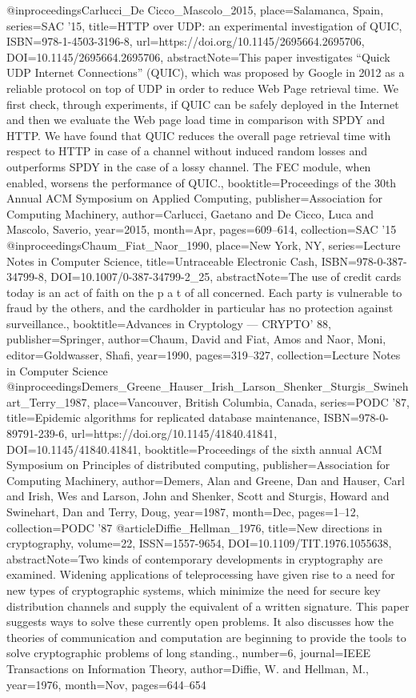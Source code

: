  @inproceedings{Carlucci_De Cicco_Mascolo_2015, place={Salamanca, Spain}, series={SAC ’15}, title={HTTP over UDP: an experimental investigation of QUIC}, ISBN={978-1-4503-3196-8}, url={https://doi.org/10.1145/2695664.2695706}, DOI={10.1145/2695664.2695706}, abstractNote={This paper investigates “Quick UDP Internet Connections” (QUIC), which was proposed by Google in 2012 as a reliable protocol on top of UDP in order to reduce Web Page retrieval time. We first check, through experiments, if QUIC can be safely deployed in the Internet and then we evaluate the Web page load time in comparison with SPDY and HTTP. We have found that QUIC reduces the overall page retrieval time with respect to HTTP in case of a channel without induced random losses and outperforms SPDY in the case of a lossy channel. The FEC module, when enabled, worsens the performance of QUIC.}, booktitle={Proceedings of the 30th Annual ACM Symposium on Applied Computing}, publisher={Association for Computing Machinery}, author={Carlucci, Gaetano and De Cicco, Luca and Mascolo, Saverio}, year={2015}, month={Apr}, pages={609–614}, collection={SAC ’15} }
 @inproceedings{Chaum_Fiat_Naor_1990, place={New York, NY}, series={Lecture Notes in Computer Science}, title={Untraceable Electronic Cash}, ISBN={978-0-387-34799-8}, DOI={10.1007/0-387-34799-2_25}, abstractNote={The use of credit cards today is an act of faith on the p a t of all concerned. Each party is vulnerable to fraud by the others, and the cardholder in particular has no protection against surveillance.}, booktitle={Advances in Cryptology — CRYPTO’ 88}, publisher={Springer}, author={Chaum, David and Fiat, Amos and Naor, Moni}, editor={Goldwasser, Shafi}, year={1990}, pages={319–327}, collection={Lecture Notes in Computer Science} }
 @inproceedings{Demers_Greene_Hauser_Irish_Larson_Shenker_Sturgis_Swinehart_Terry_1987, place={Vancouver, British Columbia, Canada}, series={PODC ’87}, title={Epidemic algorithms for replicated database maintenance}, ISBN={978-0-89791-239-6}, url={https://doi.org/10.1145/41840.41841}, DOI={10.1145/41840.41841}, booktitle={Proceedings of the sixth annual ACM Symposium on Principles of distributed computing}, publisher={Association for Computing Machinery}, author={Demers, Alan and Greene, Dan and Hauser, Carl and Irish, Wes and Larson, John and Shenker, Scott and Sturgis, Howard and Swinehart, Dan and Terry, Doug}, year={1987}, month={Dec}, pages={1–12}, collection={PODC ’87} }
 @article{Diffie_Hellman_1976, title={New directions in cryptography}, volume={22}, ISSN={1557-9654}, DOI={10.1109/TIT.1976.1055638}, abstractNote={Two kinds of contemporary developments in cryptography are examined. Widening applications of teleprocessing have given rise to a need for new types of cryptographic systems, which minimize the need for secure key distribution channels and supply the equivalent of a written signature. This paper suggests ways to solve these currently open problems. It also discusses how the theories of communication and computation are beginning to provide the tools to solve cryptographic problems of long standing.}, number={6}, journal={IEEE Transactions on Information Theory}, author={Diffie, W. and Hellman, M.}, year={1976}, month={Nov}, pages={644–654} }
